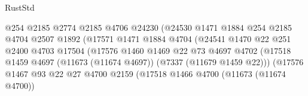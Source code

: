 \begin{lexlean}{RustStd}
\begin{coremodule}
                                          @254
                                          @2185
                                          @2774
                                          @2185
                                          @4706
                                          @24230
                                          (@24530
                                            @1471
                                            @1884
                                            @254
                                            @2185
                                            @4704
                                            @2507
                                            @1892
                                            (@17571
                                              @1471
                                              @1884
                                              @4704
                                              (@24541
                                                @1470
                                                @22
                                                @251
                                                @2400
                                                @4703
                                                @17504
                                                (@17576
                                                  @1460
                                                  @1469
                                                  @22
                                                  @73
                                                  @4697
                                                  @4702
                                                  (@17518
                                                    @1459
                                                    @4697
                                                    (@11673 (@11674 @4697))
                                                    (@7337 (@11679 @1459 @22)))
                                                  (@17576
                                                    @1467
                                                    @93
                                                    @22
                                                    @27
                                                    @4700
                                                    @2159
                                                    (@17518
                                                      @1466
                                                      @4700
                                                      (@11673 (@11674 @4700))

\end{coremodule}
\end{lexlean}
